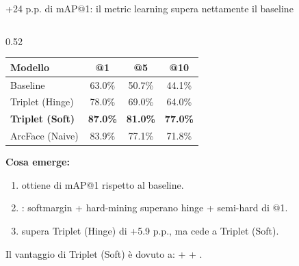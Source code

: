 \documentclass[aspectratio=169, 10pt]{beamer}
\begin{document}


\begin{frame}{+24 p.p. di mAP@1: il metric learning supera nettamente il baseline}
\begin{columns}[T, onlytextwidth]

\begin{column}{0.52\textwidth}
    \footnotesize\renewcommand{\arraystretch}{1.15}
    \begin{center}
    \begin{tabular}{lccc}
        \toprule
        \textbf{Modello} & \textbf{@1} & \textbf{@5} & \textbf{@10} \\
        \midrule
        Baseline              & 63.0\% & 50.7\% & 44.1\% \\
        Triplet (Hinge)       & 78.0\% & 69.0\% & 64.0\% \\
        \rowcolor{colGreen!18!white}
        \textbf{Triplet (Soft)} & \textbf{87.0\%} & \textbf{81.0\%} & \textbf{77.0\%} \\
        ArcFace (Naive)       & 83.9\% & 77.1\% & 71.8\% \\
        \bottomrule
    \end{tabular}
    \end{center}

    \smallskip
    \textbf{Cosa emerge:}
    \begin{enumerate}
        \item {} ottiene  di mAP@1 rispetto al baseline.
        \item {}: softmargin + hard-mining superano hinge + semi-hard di  @1.
        \item {} supera Triplet (Hinge) di +5.9 p.p., ma cede a Triplet (Soft).
    \end{enumerate}

    \smallskip
    {\scriptsize\color{colText!65!white}
    Il vantaggio di Triplet (Soft) è dovuto a:
     +  + .}
\end{column}


\end{columns}
\end{frame}
\end{document}
